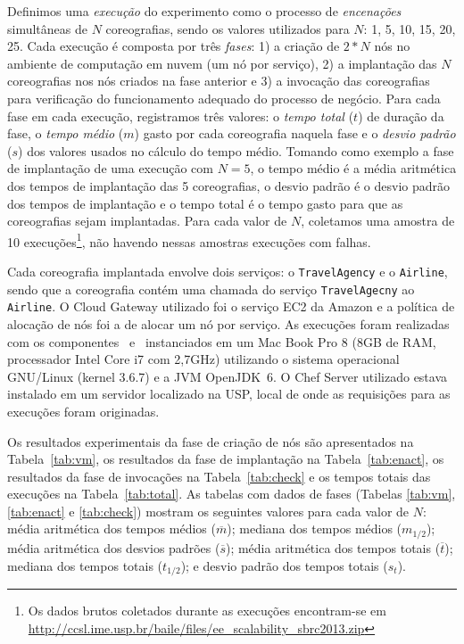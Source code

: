 Definimos uma \emph{execução} do experimento como o processo de \emph{encenações} simultâneas de $N$ coreografias, sendo os valores utilizados para $N$: 1, 5, 10, 15, 20, 25. Cada execução é composta por três \emph{fases}: 1) a criação de $2*N$ nós no ambiente de computação em nuvem (um nó por serviço), 2) a implantação das $N$ coreografias nos nós criados na fase anterior e 3) a invocação das coreografias para verificação do funcionamento adequado do processo de negócio. Para cada fase em cada execução, registramos três valores: o \emph{tempo total} ($t$) de duração da fase, o \emph{tempo médio} ($m$) gasto por cada coreografia naquela fase e o \emph{desvio padrão} ($s$) dos valores usados no cálculo do tempo médio. Tomando como exemplo a fase de implantação de uma execução com $N=5$, o tempo médio é a média aritmética dos tempos de implantação das 5 coreografias, o desvio padrão é o desvio padrão dos tempos de implantação e o tempo total é o tempo gasto para que as coreografias sejam implantadas. Para cada valor de $N$, coletamos uma amostra de 10 execuções\footnote{Os dados brutos coletados durante as execuções encontram-se em \\ \url{http://ccsl.ime.usp.br/baile/files/ee_scalability_sbrc2013.zip}}, não havendo nessas amostras execuções com falhas. 

Cada coreografia implantada envolve dois serviços: o \texttt{TravelAgency} e o \texttt{Airline}, sendo que a coreografia contém uma chamada do serviço \texttt{TravelAgecny} ao \texttt{Airline}. O Cloud Gateway utilizado foi o serviço EC2 da Amazon e a política de alocação de nós foi a de alocar um nó por serviço. As execuções foram realizadas com os componentes \eecomp\ e \dm\ instanciados em um Mac Book Pro 8 (8GB de RAM, processador Intel Core i7 com 2,7GHz) utilizando o sistema operacional GNU/Linux (kernel 3.6.7) e a JVM OpenJDK~6. O Chef Server utilizado estava instalado em um servidor localizado na USP, local de onde as requisições para as execuções foram originadas. 

Os resultados experimentais da fase de criação de nós são apresentados na Tabela~\ref{tab:vm}, os resultados da fase de implantação na Tabela~\ref{tab:enact}, os resultados da fase de invocações na Tabela~\ref{tab:check} e os tempos totais das execuções na Tabela~\ref{tab:total}. As tabelas com dados de fases (Tabelas \ref{tab:vm}, \ref{tab:enact} e \ref{tab:check}) mostram os seguintes valores para cada valor de $N$: média aritmética dos tempos médios ($\overline{m}$); mediana dos tempos médios ($m_{1/2}$); média aritmética dos desvios padrões (${\overline{s}}$); média aritmética dos tempos totais ($\overline{t}$); mediana dos tempos totais ($t_{1/2}$); e desvio padrão dos tempos totais ($s_t$). 

